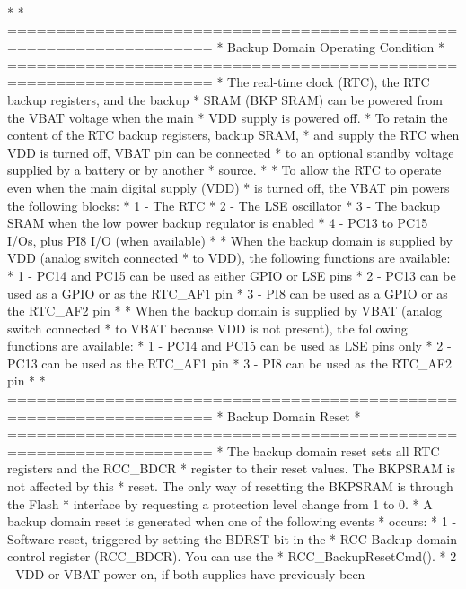 \begin{DoxyVerb}*
*          ===================================================================
*                               Backup Domain Operating Condition
*          ===================================================================
*          The real-time clock (RTC), the RTC backup registers, and the backup 
*          SRAM (BKP SRAM) can be powered from the VBAT voltage when the main 
*          VDD supply is powered off.
*          To retain the content of the RTC backup registers, backup SRAM, 
*          and supply the RTC when VDD is turned off, VBAT pin can be connected 
*          to an optional standby voltage supplied by a battery or by another 
*          source.
*
*          To allow the RTC to operate even when the main digital supply (VDD) 
*          is turned off, the VBAT pin powers the following blocks:
*            1 - The RTC
*            2 - The LSE oscillator
*            3 - The backup SRAM when the low power backup regulator is enabled
*            4 - PC13 to PC15 I/Os, plus PI8 I/O (when available)
*
*          When the backup domain is supplied by VDD (analog switch connected 
*          to VDD), the following functions are available:
*            1 - PC14 and PC15 can be used as either GPIO or LSE pins
*            2 - PC13 can be used as a GPIO or as the RTC_AF1 pin
*            3 - PI8 can be used as a GPIO or as the RTC_AF2 pin
*
*          When the backup domain is supplied by VBAT (analog switch connected 
*          to VBAT because VDD is not present), the following functions are available:
*            1 - PC14 and PC15 can be used as LSE pins only
*            2 - PC13 can be used as the RTC_AF1 pin 
*            3 - PI8 can be used as the RTC_AF2 pin
*
*          ===================================================================
*                                    Backup Domain Reset
*          ===================================================================
*          The backup domain reset sets all RTC registers and the RCC_BDCR 
*          register to their reset values. The BKPSRAM is not affected by this
*          reset. The only way of resetting the BKPSRAM is through the Flash 
*          interface by requesting a protection level change from 1 to 0.
*          A backup domain reset is generated when one of the following events
*          occurs:
*            1 - Software reset, triggered by setting the BDRST bit in the 
*                RCC Backup domain control register (RCC_BDCR). You can use the
*                RCC_BackupResetCmd().
*            2 - VDD or VBAT power on, if both supplies have previously been

\end{DoxyVerb}
